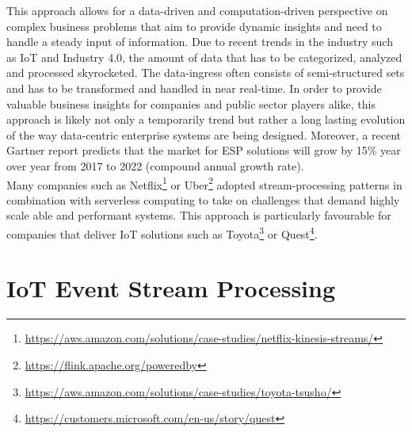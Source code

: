 \begin{enumerate}
    This approach allows for a data-driven and computation-driven perspective on complex business problems that aim to provide dynamic insights and need to handle a steady input of information. 
    Due to recent trends in the industry such as IoT and Industry 4.0, the amount of data that has to be categorized, analyzed and processed skyrocketed. The data-ingress often consists of semi-structured sets and has to be transformed and handled in near real-time.\autocite{Dekate2017PredictsInfrastructure} In order to provide valuable business insights for companies and public sector players alike, this approach is likely not only a temporarily trend but rather a long lasting evolution of the way data-centric enterprise systems are being designed. Moreover, a recent Gartner report predicts that the market for \acf{ESP} solutions will grow by 15\% year over year from 2017 to 2022 (compound annual growth rate).\autocite{Heudecker2017MarketProcessing} \\
    Many companies such as Netflix\footnote{\url{https://aws.amazon.com/solutions/case-studies/netflix-kinesis-streams/}} or Uber\footnote{\url{https://flink.apache.org/poweredby}} adopted stream-processing patterns in combination with serverless computing to take on challenges that demand highly scale able and performant systems. 
    This approach is particularly favourable for companies that deliver IoT solutions such as Toyota\footnote{\url{https://aws.amazon.com/solutions/case-studies/toyota-tsusho/}} or Quest\footnote{\url{https://customers.microsoft.com/en-us/story/quest}}.
    
\end{enumerate}


\section{IoT Event Stream Processing}

